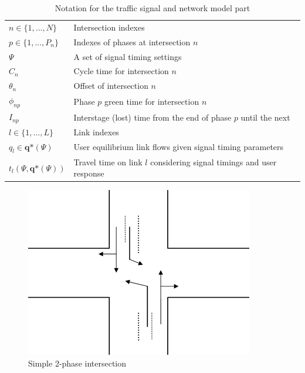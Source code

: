 \documentclass [a4paper, 10pt]{article}
\begin{document}
\begin{table}[!ht]
\begin{center}
\begin{tabular}{ll}
\hline
$n \in \lbrace 1,...,N \rbrace$ & Intersection indexes \\
$p \in \lbrace 1,...,P_n \rbrace$ & Indexes of phases at intersection $n$ \\ 
$\Psi$ & A set of signal timing settings \\
$C_n$ & Cycle time for intersection $n$ \\
$\theta_n$ & Offset of intersection $n$ \\
$\phi_{np}$ & Phase $p$ green time for intersection $n$  \\
$I_{np}$ & Interstage (lost) time from the end of phase $p$ until the next  \\
\hline
$l \in \lbrace 1,...,L \rbrace$ & Link indexes \\
$q_l \in \textbf{q*}(\Psi)$ & User equilibrium link flows given signal timing parameters  \\
$t_l(\Psi,\textbf{q*}(\Psi))$ & Travel time on link $l$ considering signal timings and user response \\
\hline
\end{tabular}
\end{center}
\caption{Notation for the traffic signal and network model part}
\label{tab:notation}
\end{table}

\begin{figure}[!ht]
\begin{center}
\includegraphics[scale=0.4]{simple_intersection.png} 
\end{center}
\caption{Simple 2-phase intersection}
\label{fig:simple_intersection}
\end{figure}
\end{document}
